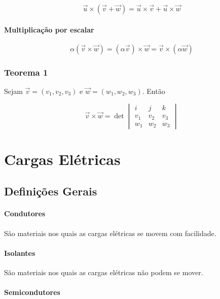 \[
\vec{u} \times (\vec{v} + \vec{w}) = \vec{u} \times \vec{v} + \vec{u} \times \vec{w}
\]

\paragraph{Multiplicação por
escalar}\label{multiplicauxe7uxe3o-por-escalar-1}

\[
\alpha (\vec{v} \times \vec{w}) = (\alpha \vec{v}) \times \vec{w} = \vec{v} \times (\alpha \vec{w})
\]

\subsubsection{Teorema 1}\label{teorema-1}

Sejam $\vec{v} = (v_1, v_2, v_3)$ e $\vec{w} = (w_1, w_2, w_3)$. Então

\[
\vec{v} \times \vec{w}
= \det
\begin{vmatrix}
i & j & k \\
v_1 & v_2 & v_3 \\
w_1 & w_2 & w_3
\end{vmatrix}
\]

\section{Cargas Elétricas}\label{cargas-eluxe9tricas}

\subsection{Definições Gerais}\label{definiuxe7uxf5es-gerais}

\paragraph{Condutores}\label{condutores}

São materiais nos quais as cargas elétricas se movem com facilidade.

\paragraph{Isolantes}\label{isolantes}

São materiais nos quais as cargas elétricas não podem se mover.

\paragraph{Semicondutores}\label{semicondutores}

